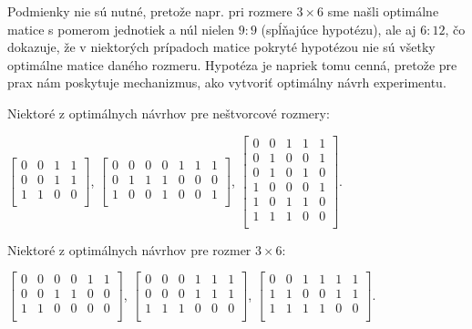 \begin{com}
Podmienky nie sú nutné, pretože napr. pri rozmere $3 \times 6$ sme našli optimálne matice s pomerom jednotiek a núl
nielen $9:9$ (spĺňajúce hypotézu), ale aj $6:12$, čo dokazuje, 
že v niektorých prípadoch matice pokryté hypotézou nie sú všetky optimálne matice daného rozmeru. 
Hypotéza je napriek tomu cenná, pretože pre prax nám poskytuje mechanizmus, ako vytvoriť optimálny návrh experimentu.
\end{com}

Niektoré z optimálnych návrhov pre neštvorcové rozmery:

\begin{center}
$
\begin{bmatrix}
0 & 0 & 1 & 1 \\
0 & 0 & 1 & 1 \\
1 & 1 & 0 & 0 \\
\end{bmatrix}
$,
$
\begin{bmatrix}
0 & 0 & 0 & 0 & 1 & 1 & 1 \\
0 & 1 & 1 & 1 & 0 & 0 & 0 \\
1 & 0 & 0 & 1 & 0 & 0 & 1 \\
\end{bmatrix}
$,
$
\begin{bmatrix}
0 & 0 & 1 & 1 & 1 \\ 
0 & 1 & 0 & 0 & 1 \\ 
0 & 1 & 0 & 1 & 0 \\ 
1 & 0 & 0 & 0 & 1 \\ 
1 & 0 & 1 & 1 & 0 \\ 
1 & 1 & 1 & 0 & 0 \\ 
\end{bmatrix}
$.
\end{center}

Niektoré z optimálnych návrhov pre rozmer $3 \times 6$:

\begin{center}
$
\begin{bmatrix}
0 & 0 & 0 & 0 & 1 & 1 \\
0 & 0 & 1 & 1 & 0 & 0 \\
1 & 1 & 0 & 0 & 0 & 0 \\
\end{bmatrix}
$,
$
\begin{bmatrix}
0 & 0 & 0 & 1 & 1 & 1 \\
0 & 0 & 0 & 1 & 1 & 1 \\
1 & 1 & 1 & 0 & 0 & 0 \\
\end{bmatrix}
$,
$
\begin{bmatrix}
0 & 0 & 1 & 1 & 1 & 1 \\
1 & 1 & 0 & 0 & 1 & 1 \\
1 & 1 & 1 & 1 & 0 & 0 \\
\end{bmatrix}
$.
\end{center}

